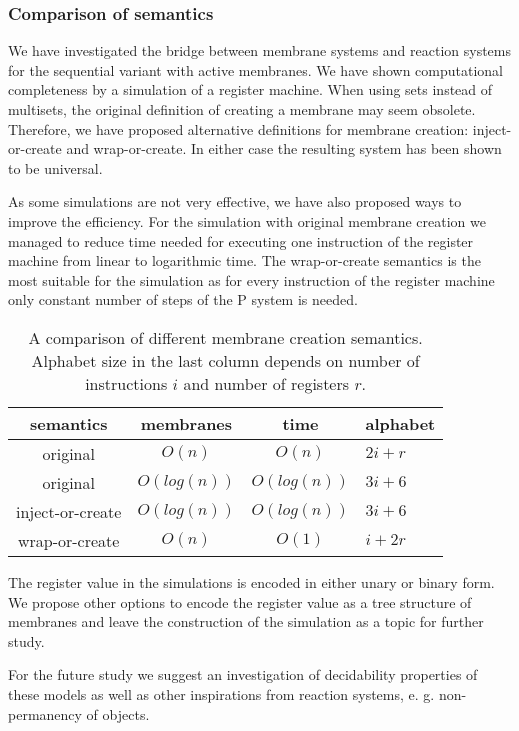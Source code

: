 
  \subsubsection{Comparison of semantics} %
  \label{ssub:comparison_of_semantics}
    
    We have investigated the bridge between membrane systems and reaction systems for the sequential variant with active membranes. We have shown computational completeness by a simulation of a register machine. When using sets instead of multisets, the original definition of creating a membrane may seem obsolete. Therefore, we have proposed alternative definitions for membrane creation: inject-or-create and wrap-or-create. In either case the resulting system has been shown to be universal.

    As some simulations are not very effective, we have also proposed ways to improve the efficiency. For the simulation with original membrane creation we managed to reduce time needed for executing one instruction of the register machine from linear to logarithmic time. The wrap-or-create semantics is the most suitable for the simulation as for every instruction of the register machine only constant number of steps of the P system is needed.

    \begin{table}[h]
      \centering
      \begin{tabular}{|c|c|c|l|}
        \hline
        semantics & membranes & time & alphabet \\ \hline
        original & $O(n)$ & $O(n)$ & $2i+r$ \\ \hline
        original & $O(log(n))$ & $O(log(n))$ & $3i+6$ \\ \hline
        inject-or-create & $O(log(n))$ & $O(log(n))$ & $3i+6$ \\ \hline
        wrap-or-create & $O(n)$ & $O(1)$ & $i+2r$ \\ \hline
      \end{tabular}
      \caption[A comparison of different membrane creation semantics]{A comparison of different membrane creation semantics. Alphabet size in the last column depends on number of instructions $i$ and number of registers $r$.}
    \end{table}

    The register value in the simulations is encoded in either unary or binary form. We propose other options to encode the register value as a tree structure of membranes and leave the construction of the simulation as a topic for further study.

    For the future study we suggest an investigation of decidability properties of these models as well as other inspirations from reaction systems, e. g. non-permanency of objects.


